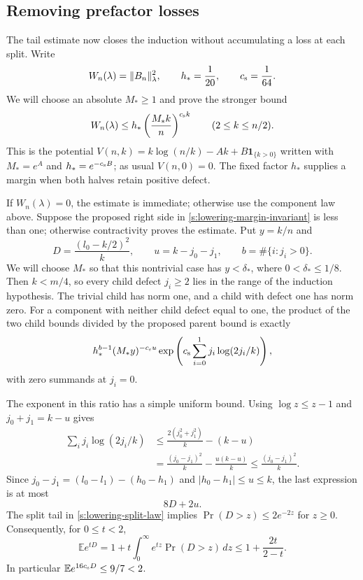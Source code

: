 \subsection{Removing prefactor losses}
The tail estimate now closes the induction without accumulating a loss
at each split.  Write
\[
 W_n(\lambda)=\|B_n\|_\lambda^2,
 \qquad h_*=\frac1{20},\qquad c_{\rm s}=\frac1{64}.
\]
We will choose an absolute $M_*\ge1$ and prove the stronger bound
\begin{equation}\label{s:lowering-margin-invariant}
 W_n(\lambda)\le h_*\left(\frac{M_*k}{n}\right)^{c_{\rm s}k}
 \qquad(2\le k\le n/2).
\end{equation}
This is the potential
$V(n,k)=k\log(n/k)-Ak+B\mathbf1_{\{k>0\}}$ written with
$M_*=e^A$ and $h_*=e^{-c_{\rm s}B}$; as usual $V(n,0)=0$.
The fixed factor $h_*$ supplies a margin when both halves retain
positive defect.

If $W_n(\lambda)=0$, the estimate is immediate; otherwise use the
component law above.  Suppose the proposed right side in
\eqref{s:lowering-margin-invariant} is less than one; otherwise
contractivity proves the estimate.  Put $y=k/n$ and
\[
 D=\frac{(l_0-k/2)^2}{k},\qquad
 u=k-j_0-j_1,\qquad b=\#\{i:j_i>0\}.
\]
We will choose $M_*$ so that this nontrivial case has $y<\delta_*$,
where $0<\delta_*\le1/8$.  Then $k<m/4$, so every child defect
$j_i\ge2$ lies in the range of the induction hypothesis.
The trivial child has norm one, and a child with defect one has norm
zero.  For a component with neither child defect equal to one, the
product of the two child bounds divided by the proposed parent bound
is exactly
\begin{equation}\label{s:lowering-induction-ratio}
 h_*^{b-1}(M_*y)^{-c_{\rm s}u}
 \exp\left(c_{\rm s}\sum_{i=0}^1j_i\log(2j_i/k)\right),
\end{equation}
with zero summands at $j_i=0$.

The exponent in this ratio has a simple uniform bound.  Using
$\log z\le z-1$ and $j_0+j_1=k-u$ gives
\begin{align*}
 \sum_i j_i\log(2j_i/k)
 &\le \frac{2(j_0^2+j_1^2)}k-(k-u)\\
 &=\frac{(j_0-j_1)^2}{k}-\frac{u(k-u)}k
 \le\frac{(j_0-j_1)^2}{k}.
\end{align*}
Since $j_0-j_1=(l_0-l_1)-(h_0-h_1)$ and
$|h_0-h_1|\le u\le k$, the last expression is at most
\begin{equation}\label{s:lowering-induction-cost}
 8D+2u.
\end{equation}
The split tail in \eqref{s:lowering-split-law} implies
$\Pr(D>z)\le2e^{-2z}$ for $z\ge0$.  Consequently, for $0\le t<2$,
\[
 \mathbb E e^{tD}
 =1+t\int_0^\infty e^{tz}\Pr(D>z)\,dz
 \le1+\frac{2t}{2-t}.
\]
In particular $\mathbb E e^{16c_{\rm s}D}\le9/7<2$.

